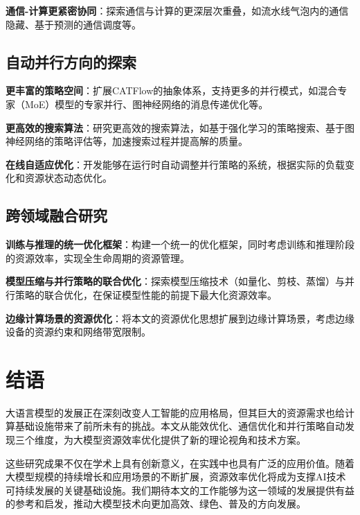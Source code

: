 \textbf{通信-计算更紧密协同}：探索通信与计算的更深层次重叠，如流水线气泡内的通信隐藏、基于预测的通信调度等。

\subsection{自动并行方向的探索}

\textbf{更丰富的策略空间}：扩展CATFlow的抽象体系，支持更多的并行模式，如混合专家（MoE）模型的专家并行、图神经网络的消息传递优化等。

\textbf{更高效的搜索算法}：研究更高效的搜索算法，如基于强化学习的策略搜索、基于图神经网络的策略评估等，加速搜索过程并提高解的质量。

\textbf{在线自适应优化}：开发能够在运行时自动调整并行策略的系统，根据实际的负载变化和资源状态动态优化。

\subsection{跨领域融合研究}

\textbf{训练与推理的统一优化框架}：构建一个统一的优化框架，同时考虑训练和推理阶段的资源效率，实现全生命周期的资源管理。

\textbf{模型压缩与并行策略的联合优化}：探索模型压缩技术（如量化、剪枝、蒸馏）与并行策略的联合优化，在保证模型性能的前提下最大化资源效率。

\textbf{边缘计算场景的资源优化}：将本文的资源优化思想扩展到边缘计算场景，考虑边缘设备的资源约束和网络带宽限制。

\section{结语}

大语言模型的发展正在深刻改变人工智能的应用格局，但其巨大的资源需求也给计算基础设施带来了前所未有的挑战。本文从能效优化、通信优化和并行策略自动发现三个维度，为大模型资源效率优化提供了新的理论视角和技术方案。

这些研究成果不仅在学术上具有创新意义，在实践中也具有广泛的应用价值。随着大模型规模的持续增长和应用场景的不断扩展，资源效率优化将成为支撑AI技术可持续发展的关键基础设施。我们期待本文的工作能够为这一领域的发展提供有益的参考和启发，推动大模型技术向更加高效、绿色、普及的方向发展。
